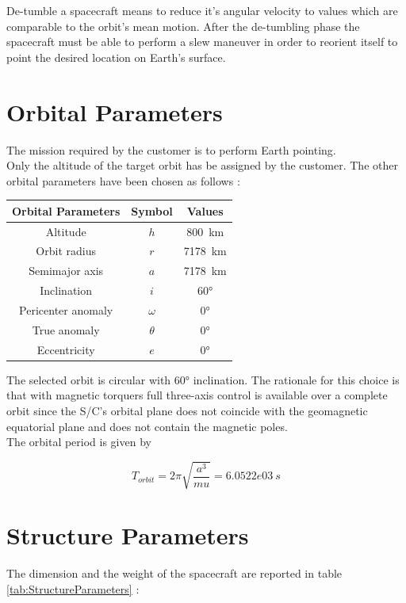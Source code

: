 \documentclass[11pt,a4paper]{report}
\begin{document}
De-tumble a spacecraft means to reduce it's angular velocity to values which are comparable to the orbit's mean motion.
After the de-tumbling phase the spacecraft must be able to perform a slew maneuver in order to reorient itself to point the desired location on Earth's surface.

\section{Orbital Parameters}
The mission required by the customer is to perform Earth pointing. \\   
Only the altitude of the target orbit has be assigned by the customer. The other orbital parameters have been chosen as follows : 

\begin{table}[H]
	\centering
	\begin{tabular}{|c|c|c|}
		\hline
		Orbital Parameters & Symbol & Values \\
		\hline
		Altitude & $h$ & \SI{800}{\km} \\ 
		\hline
		Orbit radius & $r$ & \SI{7178}{\km}\\
		\hline
		Semimajor axis & $a$ & \SI{7178}{\km}\\
		\hline
		Inclination & $i$ & \ang{60}\\
		\hline
		Pericenter anomaly & $\omega$ & \ang{0}\\
		\hline
		True anomaly & $\theta$ &  \ang{0}\\
		\hline
		Eccentricity & $e$ &  \ang{0}\\
		\hline
	\end{tabular}
\end{table}

The selected orbit is circular with \ang{60} inclination.
The rationale for this choice is that with magnetic torquers full three-axis control is available over a complete orbit since the S/C's orbital plane does not coincide with the geomagnetic equatorial plane and does not contain the magnetic poles. \\
The orbital period is given by 

$$T_{orbit} = 2\pi\sqrt{\frac{a^{3}}{mu}} = 6.0522e03 \ s$$

\section{Structure Parameters}

The dimension and the weight of the spacecraft are reported in table \ref{tab:StructureParameters} :
\end{document}
